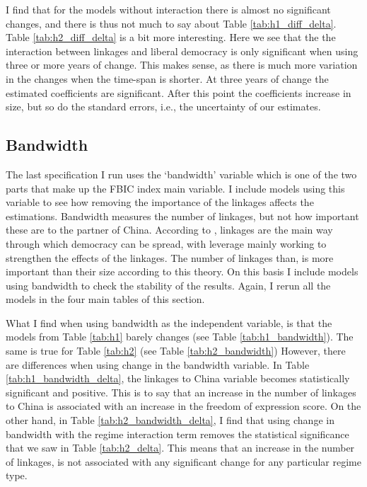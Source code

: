I find that for the models without interaction there is almost no significant changes, and there is thus not much to say about Table \ref{tab:h1_diff_delta}. Table \ref{tab:h2_diff_delta} is a bit more interesting. Here we see that the the interaction between linkages and liberal democracy is only significant when using three or more years of change. This makes sense, as there is much more variation in the changes when the time-span is shorter. At three years of change the estimated coefficients are significant. After this point the  coefficients increase in size, but so do the standard errors, i.e., the uncertainty of our estimates.

\subsection{Bandwidth}
The last specification I run uses the `bandwidth' variable which is one of the two parts that make up the FBIC index main variable. I include models using this variable to see how removing the importance of the linkages affects the estimations. Bandwidth measures the number of linkages, but not how important these are to the partner of China. According to \citet{levitsky_linkage_2006}, linkages are the main way through which democracy can be spread, with leverage mainly working to strengthen the effects of the linkages. The number of linkages than, is more important than their size according to this theory. On this basis I include models using bandwidth to check the stability of the results. Again, I rerun all the models in the four main tables of this section.

What I find when using bandwidth as the independent variable, is that the models from Table \ref{tab:h1} barely changes (see Table \ref{tab:h1_bandwidth}). The same is true for Table \ref{tab:h2} (see Table \ref{tab:h2_bandwidth}) However, there are differences when using change in the bandwidth variable. In Table \ref{tab:h1_bandwidth_delta}, the linkages to China variable becomes statistically significant and positive. This is to say that an increase in the number of linkages to China is associated with an increase in the freedom of expression score. On the other hand, in Table \ref{tab:h2_bandwidth_delta}, I find that using change in bandwidth with the regime interaction term removes the statistical significance that we saw in Table \ref{tab:h2_delta}. This means that an increase in the number of linkages, is not associated with any significant change for any particular regime type. 

